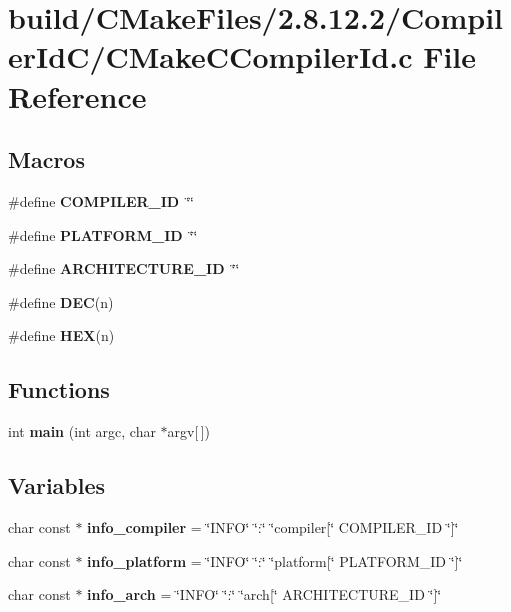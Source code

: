 \section{build/\-C\-Make\-Files/2.8.12.2/\-Compiler\-Id\-C/\-C\-Make\-C\-Compiler\-Id.c File Reference}
\label{CMakeCCompilerId_8c}
\subsection*{Macros}
\begin{DoxyCompactItemize}
\item 
\#define {\bf C\-O\-M\-P\-I\-L\-E\-R\-\_\-\-I\-D}~\char`\"{}\char`\"{}
\item 
\#define {\bf P\-L\-A\-T\-F\-O\-R\-M\-\_\-\-I\-D}~\char`\"{}\char`\"{}
\item 
\#define {\bf A\-R\-C\-H\-I\-T\-E\-C\-T\-U\-R\-E\-\_\-\-I\-D}~\char`\"{}\char`\"{}
\item 
\#define {\bf D\-E\-C}(n)
\item 
\#define {\bf H\-E\-X}(n)
\end{DoxyCompactItemize}
\subsection*{Functions}
\begin{DoxyCompactItemize}
\item 
int {\bf main} (int argc, char $\ast$argv[$\,$])
\end{DoxyCompactItemize}
\subsection*{Variables}
\begin{DoxyCompactItemize}
\item 
char const $\ast$ {\bf info\-\_\-compiler} = \char`\"{}I\-N\-F\-O\char`\"{} \char`\"{}\-:\char`\"{} \char`\"{}compiler[\char`\"{} C\-O\-M\-P\-I\-L\-E\-R\-\_\-\-I\-D \char`\"{}]\char`\"{}
\item 
char const $\ast$ {\bf info\-\_\-platform} = \char`\"{}I\-N\-F\-O\char`\"{} \char`\"{}\-:\char`\"{} \char`\"{}platform[\char`\"{} P\-L\-A\-T\-F\-O\-R\-M\-\_\-\-I\-D \char`\"{}]\char`\"{}
\item 
char const $\ast$ {\bf info\-\_\-arch} = \char`\"{}I\-N\-F\-O\char`\"{} \char`\"{}\-:\char`\"{} \char`\"{}arch[\char`\"{} A\-R\-C\-H\-I\-T\-E\-C\-T\-U\-R\-E\-\_\-\-I\-D \char`\"{}]\char`\"{}
\end{DoxyCompactItemize}


